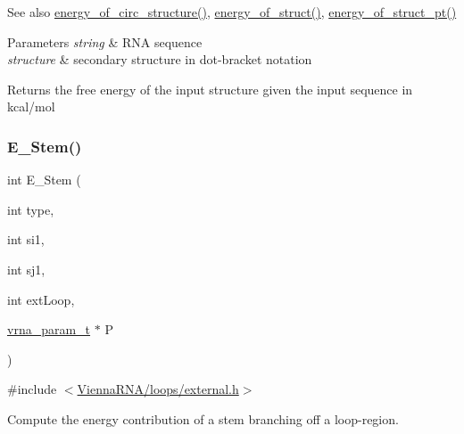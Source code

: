 \begin{DoxySeeAlso}{See also}
\mbox{\hyperlink{group__eval__deprecated_gaeb14f3664aec67fc03268ac75253f0f8}{energy\+\_\+of\+\_\+circ\+\_\+structure()}}, \mbox{\hyperlink{group__eval__deprecated_gac2b37fea2145c94d925a3f33378ef87b}{energy\+\_\+of\+\_\+struct()}}, \mbox{\hyperlink{group__eval__deprecated_ga27ce6f68512d43bf1fe14a06c9d76d5c}{energy\+\_\+of\+\_\+struct\+\_\+pt()}} 
\end{DoxySeeAlso}

\begin{DoxyParams}{Parameters}
{\em string} & R\+NA sequence \\
\hline
{\em structure} & secondary structure in dot-\/bracket notation \\
\hline
\end{DoxyParams}
\begin{DoxyReturn}{Returns}
the free energy of the input structure given the input sequence in kcal/mol 
\end{DoxyReturn}
\mbox{\label{group__eval__deprecated_ga51f9851f3500c2aae66674142a6a2dd5}} 
\subsubsection{\texorpdfstring{E\_Stem()}{E\_Stem()}}
{\footnotesize\ttfamily int E\+\_\+\+Stem (\begin{DoxyParamCaption}\item[{int}]{type,  }\item[{int}]{si1,  }\item[{int}]{sj1,  }\item[{int}]{ext\+Loop,  }\item[{\mbox{\hyperlink{group__energy__parameters_ga8a69ca7d787e4fd6079914f5343a1f35}{vrna\+\_\+param\+\_\+t}} $\ast$}]{P }\end{DoxyParamCaption})}



{\ttfamily \#include $<$\mbox{\hyperlink{external_8h}{Vienna\+R\+N\+A/loops/external.\+h}}$>$}



Compute the energy contribution of a stem branching off a loop-\/region. 

